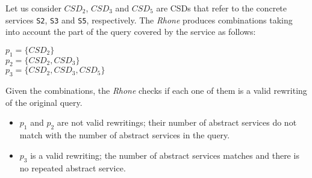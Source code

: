 Let us consider $CSD_{2}$, $CSD_{3}$ and $CSD_{5}$ are CSDs that refer to the concrete services \texttt{S2}, \texttt{S3} and \texttt{S5}, respectively. The \textit{Rhone} produces combinations taking into account the part of the query covered by the service as follows:
\begin{flushleft}
$p_{1} = \lbrace CSD_{2} \rbrace$ \\
$p_{2} = \lbrace CSD_{2}, CSD_{3} \rbrace$ \\
$p_{3} = \lbrace CSD_{2}, CSD_{3}, CSD_{5} \rbrace$
\end{flushleft}
Given the combinations, the \textit{Rhone} checks if each one of them is a valid
rewriting of the original query.
\begin{itemize}
\item $p_{1}$ and $p_{2}$ are not valid rewritings; their number of abstract services do not match with the number of abstract services in the query.
\item $p_{3}$ is a valid rewriting; the number of abstract services matches and there is no repeated abstract service. 
\end{itemize}

	

